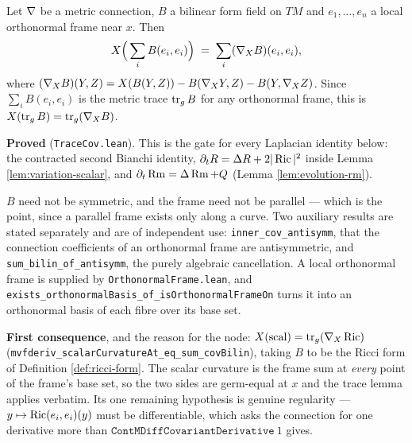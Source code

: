 \begin{lemma}
  \label{lem:metric-trace-cov}
  \leanok
  Let $\nabla$ be a metric connection, $B$ a bilinear form field on $TM$ and
  $e_1, \dots, e_n$ a local orthonormal frame near $x$. Then
  \[
    X\Big(\sum_i B(e_i, e_i)\Big) \;=\; \sum_i (\nabla_X B)(e_i, e_i),
  \]
  where $(\nabla_X B)(Y,Z) = X(B(Y,Z)) - B(\nabla_X Y, Z) - B(Y, \nabla_X Z)$. Since
  $\sum_i B(e_i,e_i)$ is the metric trace $\operatorname{tr}_g B$ for any
  orthonormal frame, this is $X(\operatorname{tr}_g B) =
  \operatorname{tr}_g(\nabla_X B)$.

  \textbf{Proved} (\texttt{TraceCov.lean}). This is the gate for every
  Laplacian identity below: the contracted second Bianchi identity, $\partial_t
  R = \Delta R + 2|\operatorname{Ric}|^2$ inside Lemma \ref{lem:variation-scalar}, and
  $\partial_t \operatorname{Rm} = \Delta \operatorname{Rm} + Q$ (Lemma \ref{lem:evolution-rm}).

  $B$ need not be symmetric, and the frame need not be parallel --- which is
  the point, since a parallel frame exists only along a curve. Two auxiliary
  results are stated separately and are of independent use:
  \texttt{inner\_cov\_antisymm}, that the connection coefficients of an
  orthonormal frame are antisymmetric, and
  \texttt{sum\_bilin\_of\_antisymm}, the purely algebraic cancellation.
  A local orthonormal frame is supplied by \texttt{OrthonormalFrame.lean}, and
  \texttt{exists\_orthonormalBasis\_of\_isOrthonormalFrameOn} turns it into
  an orthonormal basis of each fibre over its base set.

  \textbf{First consequence}, and the reason for the node:
  $X(\operatorname{scal}) = \operatorname{tr}_g(\nabla_X \operatorname{Ric})$
  (\texttt{mvfderiv\_scalarCurvatureAt\_eq\_sum\_covBilin}), taking $B$ to be
  the Ricci form of Definition \ref{def:ricci-form}. The scalar curvature is the
  frame sum at \emph{every} point of the frame's base set, so the two sides are
  germ-equal at $x$ and the trace lemma applies verbatim. Its one remaining
  hypothesis is genuine regularity --- $y \mapsto \operatorname{Ric}(e_i,e_i)(y)$ must be
  differentiable, which asks the connection for one derivative more than
  $\texttt{ContMDiffCovariantDerivative}\ 1$ gives.
\end{lemma}

